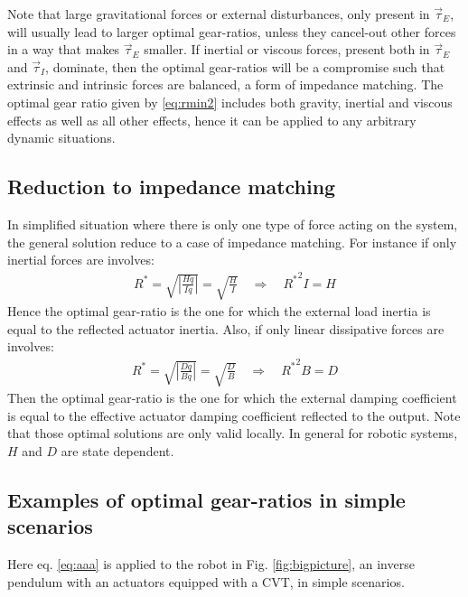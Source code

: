 Note that large gravitational forces or external disturbances, only present in $\vec{\tau}_{E}$, will usually lead to larger optimal gear-ratios, unless they cancel-out other forces in a way that makes $\vec{\tau}_{E}$ smaller. If inertial or viscous forces, present both in $\vec{\tau}_{E}$ and $\vec{\tau}_{I}$, dominate, then the optimal gear-ratios will be a compromise such that extrinsic and intrinsic forces are balanced, a form of impedance matching. The optimal gear ratio given by \eqref{eq:rmin2} includes both gravity, inertial and viscous effects as well as all other effects, hence it can be applied to any arbitrary dynamic situations.


\subsection{Reduction to impedance matching}
\label{sec:impreduc}

In simplified situation where there is only one type of force acting on the system, the general solution reduce to a case of impedance matching. For instance if only inertial forces are involves:
%
\begin{align}
	R^{*}  = \sqrt{ \left | \frac{H \ddot{q} }{ I \ddot{q} } \right |   } = \sqrt{ \frac{H}{I}}  \quad\Rightarrow\quad  {R^{*}}^2 I = H
 \label{eq:impmatchingHI}
\end{align}
%
Hence the optimal gear-ratio is the one for which the external load inertia is equal to the reflected actuator inertia. Also, if only linear dissipative forces are involves:
%
\begin{align}
	R^{*}  = \sqrt{ \left | \frac{D \dot{q} }{ B \dot{q} } \right |   } = \sqrt{ \frac{D}{B}}  \quad\Rightarrow\quad  {R^{*}}^2 B = D
 \label{eq:impmatchingDB}
\end{align}
%
Then the optimal gear-ratio is the one for which the external damping coefficient is equal to the effective actuator damping coefficient reflected to the output. Note that those optimal solutions are only valid locally. In general for robotic systems, $H$ and $D$ are state dependent. 


\newpage

\subsection{Examples of optimal gear-ratios in simple scenarios}
\label{sec:Examples}

Here eq. \eqref{eq:aaa} is applied to the robot in Fig. \ref{fig:bigpicture}, an inverse pendulum with an actuators equipped with a CVT, in simple scenarios. 

